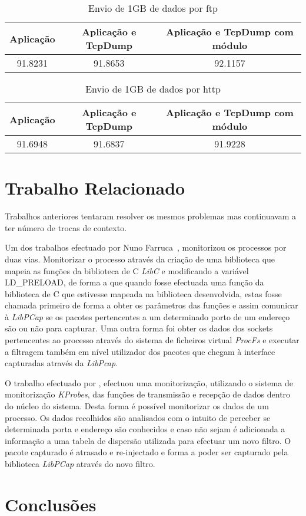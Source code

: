 \documentclass[a4paper]{llncs}
\begin{document}
\begin{table}
\caption{Envio de 1GB de dados por ftp}
\begin{tabular}{| c | c | c |}
\hline
\hspace {1cm} Aplicação \hspace {1cm} & Aplicação e TcpDump & Aplicação e TcpDump com módulo \\
\hline
91.8231 & 91.8653 & 92.1157 \\
\hline
\end{tabular}
\end{table}

\begin{center}
\begin{table}
\caption{Envio de 1GB de dados por http}
\begin{tabular}{ | c | c | c  | }
\hline
\hspace {1cm} Aplicação \hspace {1cm} & Aplicação e TcpDump & Aplicação e TcpDump com módulo \\
\hline
91.6948 & 91.6837 & 91.9228 \\
\hline
\end{tabular}
\end{table}
\end{center}

\section{Trabalho Relacionado}
\label{sec:related_work}
Trabalhos anteriores tentaram resolver os mesmos problemas mas continuavam a ter número de trocas de contexto.

Um dos trabalhos efectuado por Nuno Farruca~\cite{Farruca:2009}, monitorizou os processos por duas vias. Monitorizar o processo através da criação de uma biblioteca que mapeia as funções da biblioteca de C \textit{LibC} e modificando a variável LD\_PRELOAD, de forma a que quando fosse efectuada uma função da biblioteca de C que estivesse mapeada na biblioteca desenvolvida, estas fosse chamada primeiro de forma a obter os parâmetros das funções e assim comunicar à \textit{LibPCap} se os pacotes pertencentes a um determinado porto de um endereço são ou não para capturar. Uma outra forma foi obter os dados dos sockets pertencentes ao processo através do sistema de ficheiros virtual \textit{ProcFs} e executar a filtragem também em nível utilizador dos pacotes que chegam à interface capturadas através da \textit{LibPcap}.

O trabalho efectuado por \cite{1688981}, efectuou uma monitorização, utilizando o sistema de monitorização \textit{KProbes}, das funções de transmissão e recepção de dados dentro do núcleo do sistema. Desta forma é possível monitorizar os dados de um processo. Os dados recolhidos são analisados com o intuito de perceber se determinada porta e endereço são conhecidos e caso não sejam é adicionada a informação a uma tabela de dispersão utilizada para efectuar um novo filtro. O pacote capturado  é atrasado e re-injectado e forma a poder ser capturado pela biblioteca \textit{LibPCap} através do novo filtro.

\section{Conclusões}
\label{sec:conclusions}




\end{document}
